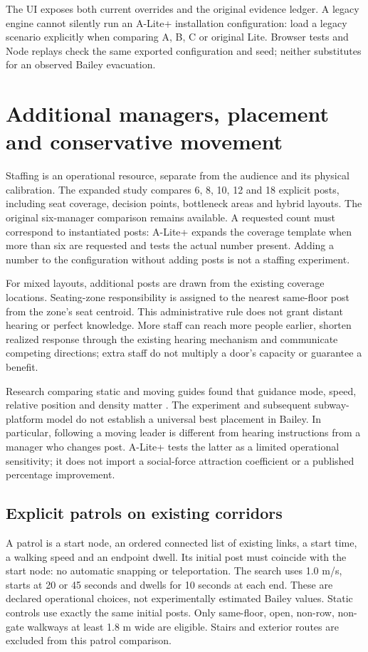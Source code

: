 \documentclass[11pt,a4paper]{article}
\begin{document}
The UI exposes both current overrides and the original evidence ledger. A legacy engine cannot silently run an A-Lite+ installation configuration: load a legacy scenario explicitly when comparing A, B, C or original Lite. Browser tests and Node replays check the same exported configuration and seed; neither substitutes for an observed Bailey evacuation.


\section{Additional managers, placement and conservative movement}\label{sec:27}

Staffing is an operational resource, separate from the audience and its physical calibration. The expanded study compares 6, 8, 10, 12 and 18 explicit posts, including seat coverage, decision points, bottleneck areas and hybrid layouts. The original six-manager comparison remains available. A requested count must correspond to instantiated posts: A-Lite+ expands the coverage template when more than six are requested and tests the actual number present. Adding a number to the configuration without adding posts is not a staffing experiment.


For mixed layouts, additional posts are drawn from the existing coverage locations. Seating-zone responsibility is assigned to the nearest same-floor post from the zone's seat centroid. This administrative rule does not grant distant hearing or perfect knowledge. More staff can reach more people earlier, shorten realized response through the existing hearing mechanism and communicate competing directions; extra staff do not multiply a door's capacity or guarantee a benefit.


Research comparing static and moving guides found that guidance mode, speed, relative position and density matter \cite{R28}. The experiment and subsequent subway-platform model do not establish a universal best placement in Bailey. In particular, following a moving leader is different from hearing instructions from a manager who changes post. A-Lite+ tests the latter as a limited operational sensitivity; it does not import a social-force attraction coefficient or a published percentage improvement.


\subsection{Explicit patrols on existing corridors}

A patrol is a start node, an ordered connected list of existing links, a start time, a walking speed and an endpoint dwell. Its initial post must coincide with the start node: no automatic snapping or teleportation. The search uses 1.0 m/s, starts at 20 or 45 seconds and dwells for 10 seconds at each end. These are declared operational choices, not experimentally estimated Bailey values. Static controls use exactly the same initial posts. Only same-floor, open, non-row, non-gate walkways at least 1.8 m wide are eligible. Stairs and exterior routes are excluded from this patrol comparison.
\end{document}
